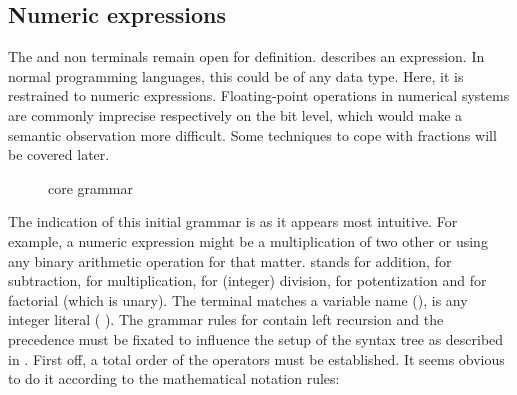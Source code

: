 \begin{figure}
	\centering

	

	\caption{}
	\label{fig:grammar_core_progonly_raw}
\end{figure}

\begin{figure}[H]
	\centering

	

	\caption{}
	\label{fig:grammar_core_progonly_final}
\end{figure}

\FloatBarrier
\subsection{Numeric expressions}

The  and  non terminals remain open for definition.  describes an expression. In normal programming languages, this could be of any data type. Here, it is restrained to numeric expressions. Floating-point operations in numerical systems are commonly imprecise respectively on the bit level, which would make a semantic observation more difficult. Some techniques to cope with fractions will be covered later.

\begin{figure}[H]
	
	
	\caption{core  grammar}
	\label{fig:grammar_core_exp_raw}
\end{figure}

The indication of this initial grammar is as it appears most intuitive. For example, a numeric expression might be a multiplication of two other  or using any binary arithmetic operation for that matter. \textterminal{\opplus{}} stands for addition, \textterminal{\opminus{}} for subtraction, \textterminal{\opmult{}} for multiplication, \textterminal{\opdiv{}} for (integer) division, \textterminal{\oppow{}} for potentization and \textterminal{\opfact{}} for factorial (which is unary). The terminal  matches a variable name (\textregex{[a-zA-Z][a-zA-Z0-9]*}),  is any integer literal (\textregex{[1-9][0-9]*} \textbar{} ). The grammar rules for  contain left recursion and the precedence must be fixated to influence the setup of the syntax tree as described in . First off, a total order of the operators must be established. It seems obvious to do it according to the mathematical notation rules:

